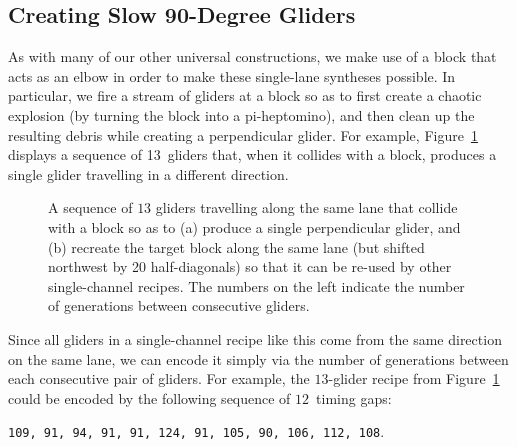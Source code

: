 \subsection{Creating Slow 90-Degree Gliders}\label{sec:single_channel_create_perp_glider}

As with many of our other universal constructions, we make use of a block that acts as an elbow in order to make these single-lane syntheses possible. In particular, we fire a stream of gliders at a block so as to first create a chaotic explosion (by turning the block into a pi-heptomino), and then clean up the resulting debris while creating a perpendicular glider. For example, Figure~\ref{fig:90_degree_first_example} displays a sequence of 13~gliders that, when it collides with a block, produces a single glider travelling in a different direction.

\begin{figure}[!htb]
	\centering
	\caption{A sequence of $13$ gliders travelling along the same lane that collide with a block so as to (a) produce a single perpendicular glider, and (b) recreate the target block along the same lane (but shifted northwest by 20 half-diagonals) so that it can be re-used by other single-channel recipes. The numbers on the left indicate the number of generations between consecutive gliders.}\label{fig:90_degree_first_example}
\end{figure}

Since all gliders in a single-channel recipe like this come from the same direction on the same lane, we can encode it simply via the number of generations between each consecutive pair of gliders. For example, the $13$-glider recipe from Figure~\ref{fig:90_degree_first_example} could be encoded by the following sequence of $12$~timing gaps:
\begin{center}
	\texttt{109, 91, 94, 91, 91, 124, 91, 105, 90, 106, 112, 108}.
\end{center}

